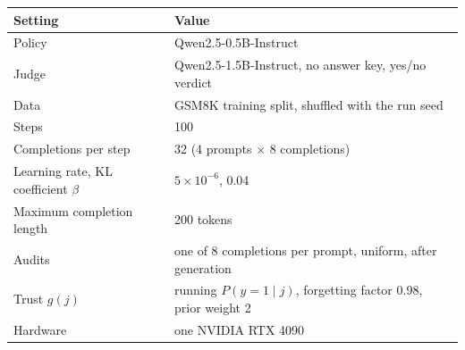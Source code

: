 \begin{table}[h]
\centering
\small
\begin{tabular}{@{}ll@{}}
\toprule
Setting & Value \\
\midrule
Policy & Qwen2.5-0.5B-Instruct \\
Judge & Qwen2.5-1.5B-Instruct, no answer key, yes/no verdict \\
Data & GSM8K training split, shuffled with the run seed \\
Steps & 100 \\
Completions per step & 32 (4 prompts $\times$ 8 completions) \\
Learning rate, KL coefficient $\beta$ & $5\times10^{-6}$, 0.04 \\
Maximum completion length & 200 tokens \\
Audits & one of 8 completions per prompt, uniform, after generation \\
Trust $g(j)$ & running $P(y=1\mid j)$, forgetting factor 0.98, prior weight 2 \\
Hardware & one NVIDIA RTX 4090 \\
\bottomrule
\end{tabular}
\end{table}


